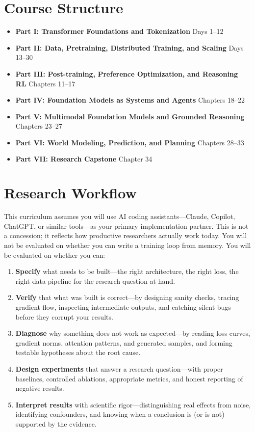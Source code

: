 \chapter*{Course Structure}

\begin{itemize}
    \item \textbf{Part I: Transformer Foundations and Tokenization} \hfill Days 1--12
    \item \textbf{Part II: Data, Pretraining, Distributed Training, and Scaling} \hfill Days 13--30
    \item \textbf{Part III: Post-training, Preference Optimization, and Reasoning RL} \hfill Chapters 11--17
    \item \textbf{Part IV: Foundation Models as Systems and Agents} \hfill Chapters 18--22
    \item \textbf{Part V: Multimodal Foundation Models and Grounded Reasoning} \hfill Chapters 23--27
    \item \textbf{Part VI: World Modeling, Prediction, and Planning} \hfill Chapters 28--33
    \item \textbf{Part VII: Research Capstone} \hfill Chapter 34
\end{itemize}

\chapter*{Research Workflow}

This curriculum assumes you will use AI coding assistants---Claude, Copilot, ChatGPT, or similar tools---as your primary implementation partner. This is not a concession; it reflects how productive researchers actually work today. You will not be evaluated on whether you can write a training loop from memory. You will be evaluated on whether you can:

\begin{enumerate}
    \item \textbf{Specify} what needs to be built---the right architecture, the right loss, the right data pipeline for the research question at hand.
    \item \textbf{Verify} that what was built is correct---by designing sanity checks, tracing gradient flow, inspecting intermediate outputs, and catching silent bugs before they corrupt your results.
    \item \textbf{Diagnose} why something does not work as expected---by reading loss curves, gradient norms, attention patterns, and generated samples, and forming testable hypotheses about the root cause.
    \item \textbf{Design experiments} that answer a research question---with proper baselines, controlled ablations, appropriate metrics, and honest reporting of negative results.
    \item \textbf{Interpret results} with scientific rigor---distinguishing real effects from noise, identifying confounders, and knowing when a conclusion is (or is not) supported by the evidence.
\end{enumerate}

